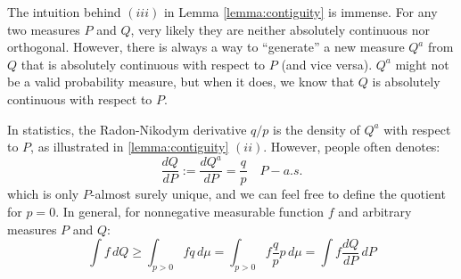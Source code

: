 \documentclass{article}
\begin{document}
The intuition behind $(iii)$ in Lemma \ref{lemma:contiguity} is immense. For any two measures $P$ and $Q$, very likely they are neither absolutely continuous nor orthogonal. However, there is always a way to ``generate'' a new measure $Q^a$ from $Q$ that is absolutely continuous with respect to $P$ (and vice versa). $Q^a$ might not be a valid probability measure, but when it does, we know that $Q$ is absolutely continuous with respect to $P$.

In statistics, the Radon-Nikodym derivative $q/p$ is the density of $Q^a$ with respect to $P$, as illustrated in \ref{lemma:contiguity} $(ii)$. However, people often denotes:
\begin{equation}\label{eq:p-eq-def}
    \frac{dQ}{dP} := \frac{dQ^a}{dP} = \frac{q}{p} \quad P - a.s.
\end{equation}
which is only $P$-almost surely unique, and we can feel free to define the quotient for $p = 0$. In general, for nonnegative measurable function $f$ and arbitrary measures $P$ and $Q$:
\begin{equation}\label{eq:p-eq-ineq}
    \int f \, dQ \geq \int_{p>0} f q \, d\mu = \int_{p>0} f \frac{q}{p} p \, d\mu = \int f \frac{dQ}{dP} \, dP
\end{equation}
\end{document}

